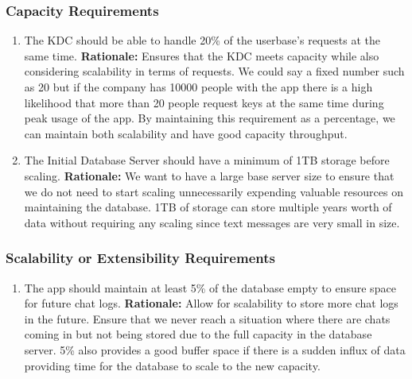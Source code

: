 \documentclass[]{article}
\begin{document}
\subsubsection{Capacity Requirements}
\label{ssub:capacity_requirements}
\begin{enumerate}[{PR-C}1. ]
	\item The KDC should be able to handle 20\% of the userbase’s requests at the same time. \newline
	      \textbf{Rationale:} Ensures that the KDC meets capacity while also considering scalability in terms of requests. We could say a fixed number such as 20 but if the company has 10000 people with the app there is a high likelihood that more than 20 people request keys at the same time during peak usage of the app. By maintaining this requirement as a percentage, we can maintain both scalability and have good capacity throughput.
	\item The Initial Database Server should have a minimum of 1TB storage before scaling. \newline
	      \textbf{Rationale:}  We want to have a large base server size to ensure that we do not need to start scaling unnecessarily expending valuable resources on maintaining the database. 1TB of storage can store multiple years worth of data without requiring any scaling since text messages are very small in size.

\end{enumerate}

\subsubsection{Scalability or Extensibility Requirements}
\label{ssub:scalability_or_extensibility_requirements}
\begin{enumerate}[{PR-SE}1. ]
	\item The app should maintain at least 5\% of the database empty to ensure space for future chat logs. \newline
	      \textbf{Rationale:} Allow for scalability to store more chat logs in the future. Ensure that we never reach a situation where there are chats coming in but not being stored due to the full capacity in the database server. 5\% also provides a good buffer space if there is a sudden influx of data providing time for the database to scale to the new capacity.

\end{enumerate}
\end{document}
